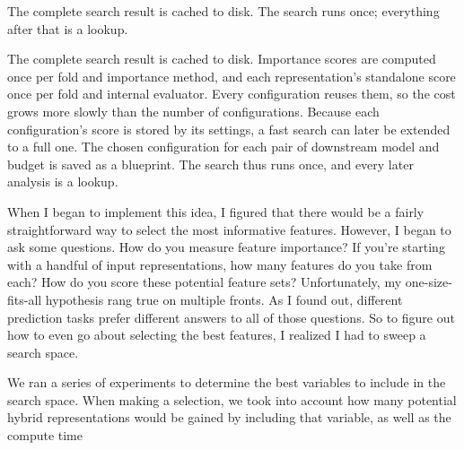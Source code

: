 
The complete search result is cached to disk. The search runs once; everything after that is a lookup.

The complete search result is cached to disk. Importance scores are computed once per fold and importance method, and each representation's standalone score once per fold and internal evaluator. Every configuration reuses them, so the cost grows more slowly than the number of configurations. Because each configuration's score is stored by its settings, a fast search can later be extended to a full one. The chosen configuration for each pair of downstream model and budget is saved as a blueprint. The search thus runs once, and every later analysis is a lookup.

When I began to implement this idea, I figured that there would be a fairly straightforward way to select the most informative features. However, I began to ask some questions. How do you measure feature importance? If you're starting with a handful of input representations, how many features do you take from each? How do you score these potential feature sets?  Unfortunately, my one-size-fits-all hypothesis rang true on multiple fronts. As I found out, different prediction tasks prefer different answers to all of those questions. So to figure out how to even go about selecting the best features, I realized I had to sweep a search space.

We ran a series of experiments to determine the best variables to include in the search space.
When making a selection, we took into account how many potential hybrid representations would be gained by including that variable, as well as the compute time

